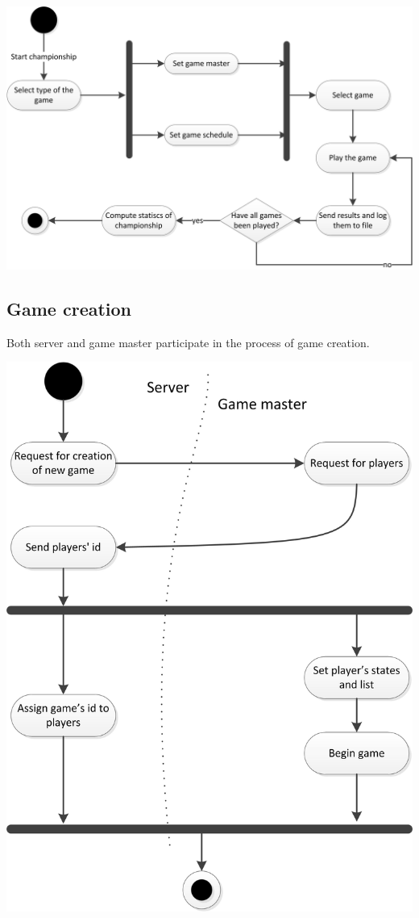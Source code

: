\documentclass{article}
\begin{document}
\includegraphics[scale=0.80]{UGS_activities_champioship_management.jpg}


\pagebreak[4]


\subsection{Game creation}
Both server and game master participate in the process of game creation.

\includegraphics[scale=1.00]{UGS_activities_game_creation.jpg}
\end{document}
